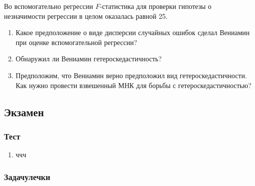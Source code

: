 \begin{enumerate}
Во вспомогательно регрессии $F$-статистика для проверки гипотезы о незначимости регрессии в целом оказалась равной 25. 

\begin{enumerate}
  \item Какое предположение о виде дисперсии случайных ошибок сделал Вениамин при оценке вспомогательной регрессии?
  \item Обнаружил ли Вениамин гетероскедастичность?
  \item Предположим, что Вениамин верно предположил вид гетероскедастичности. 
  Как нужно провести взвешенный МНК для борьбы с гетероскедастичностью?
\end{enumerate}

\end{enumerate}



\subsection{Экзамен}

\subsubsection*{Тест}

\begin{enumerate}
  \item ччч
\end{enumerate}

\subsubsection*{Задачулечки}

